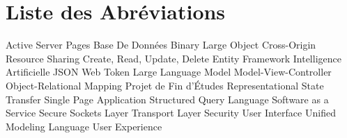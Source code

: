 \chapter*{Liste des Abréviations}

\begin{acronym}[XXXXXX]
    {Active Server Pages}
    {Base De Données}
   {Binary Large Object}
   {Cross-Origin Resource Sharing}
   {Create, Read, Update, Delete}
     {Entity Framework}
     {Intelligence Artificielle}
    {JSON Web Token}
    {Large Language Model}
    {Model-View-Controller}
    {Object-Relational Mapping}
    {Projet de Fin d'Études}
   {Representational State Transfer}
    {Single Page Application}
    {Structured Query Language}
   {Software as a Service}
    {Secure Sockets Layer}
    {Transport Layer Security}
     {User Interface}
    {Unified Modeling Language}
     {User Experience}
\end{acronym}
